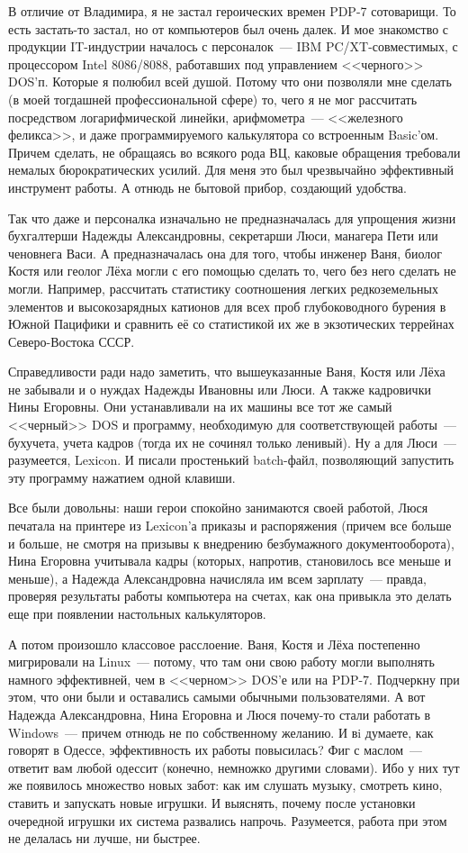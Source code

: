 В отличие от Владимира, я не застал героических времен PDP-7 сотоварищи. То есть застать-то застал, но от компьютеров был очень далек. И мое знакомство с продукции IT-индустрии началось с персоналок~--- IBM PC/XT-совместимых, с процессором Intel 8086/8088, работавших под управлением <<черного>> DOS'п. Которые я полюбил всей душой. Потому что они позволяли мне сделать (в моей тогдашней профессиональной сфере) то, чего я не мог рассчитать посредством логарифмической линейки, арифмометра~--- <<железного феликса>>, и даже программируемого калькулятора со встроенным Basic'ом. Причем сделать, не обращаясь во всякого рода ВЦ, каковые обращения требовали немалых бюрократических усилий. Для меня это был чрезвычайно эффективный инструмент работы. А отнюдь не бытовой прибор, создающий удобства. 

Так что даже и персоналка изначально не предназначалась для упрощения жизни бухгалтерши Надежды Александровны, секретарши Люси, манагера Пети или ченовнега Васи. А предназначалась она для того, чтобы инженер Ваня, биолог Костя или геолог Лёха могли с его помощью сделать то, чего без него сделать не могли. Например, рассчитать статистику соотношения легких редкоземельных элементов и высокозарядных катионов для всех проб глубоководного бурения в Южной Пацифики и сравнить её со статистикой их же в экзотических террейнах Северо-Востока СССР. 

Справедливости ради надо заметить, что вышеуказанные Ваня, Костя или Лёха не забывали и о нуждах Надежды Ивановны или Люси. А также кадровички Нины Егоровны. Они устанавливали на их машины все тот же самый <<черный>> DOS и программу, необходимую для соответствующей работы~--- бухучета, учета кадров (тогда их не сочинял только ленивый). Ну а для Люси~--- разумеется, Lexicon. И писали простенький batch-файл, позволяющий запустить эту программу нажатием одной клавиши. 

Все были довольны: наши герои спокойно занимаются своей работой, Люся печатала на принтере из Lexicon'а приказы и распоряжения (причем все больше и больше, не смотря на призывы к внедрению безбумажного документооборота), Нина Егоровна учитывала кадры (которых, напротив, становилось все меньше и меньше), а Надежда Александровна начисляла им всем зарплату~--- правда, проверяя результаты работы компьютера на счетах, как она привыкла это делать еще при появлении настольных калькуляторов. 

А потом произошло классовое расслоение. Ваня, Костя и Лёха постепенно мигрировали на Linux~--- потому, что там они свою работу могли выполнять намного эффективней, чем в <<черном>> DOS'е или на PDP-7. Подчеркну при этом, что они были и оставались самыми обычными пользователями. А вот Надежда Александровна, Нина Егоровна и Люся почему-то стали работать в Windows~--- причем отнюдь не по собственному желанию. И вi думаете, как говорят в Одессе, эффективность их работы повысилась? Фиг с маслом~--- ответит вам любой одессит (конечно, немножко другими словами). Ибо у них тут же появилось множество новых забот: как им слушать музыку, смотреть кино, ставить и запускать новые игрушки. И выяснять, почему после установки очередной игрушки их система развались напрочь. Разумеется, работа при этом не делалась ни лучше, ни быстрее. 

